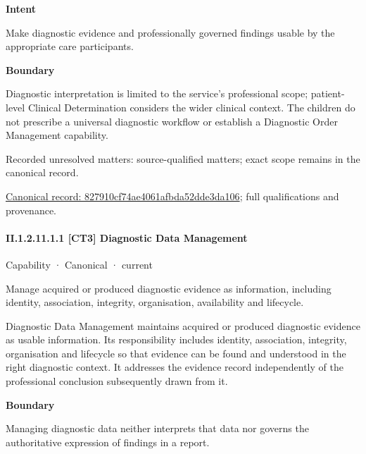 \textbf{Intent}



Make diagnostic evidence and professionally governed findings usable by the appropriate care participants.



\textbf{Boundary}



Diagnostic interpretation is limited to the service's professional scope; patient-level Clinical Determination considers the wider clinical context. The children do not prescribe a universal diagnostic workflow or establish a Diagnostic Order Management capability.


{\small Recorded unresolved matters: source-qualified matters; exact scope remains in the canonical record.}\par
{\footnotesize \href{../../../../continuum/strategy/capability/827910cf74ae4061afbda52dde3da106.md}{Canonical record: 827910cf74ae4061afbda52dde3da106}; full qualifications and provenance.}\par
\paragraph*{II.1.2.11.1.1 [CT3] Diagnostic Data Management}
\label{navigation:II.1.2.11.1.1}

\label{element:aeb8e6d2225a4df38e61ae116850b32c}
{\small Capability · Canonical · current}\par

Manage acquired or produced diagnostic evidence as information, including identity, association, integrity, organisation, availability and lifecycle.



Diagnostic Data Management maintains acquired or produced diagnostic evidence as usable information. Its responsibility includes identity, association, integrity, organisation and lifecycle so that evidence can be found and understood in the right diagnostic context. It addresses the evidence record independently of the professional conclusion subsequently drawn from it.



\textbf{Boundary}



Managing diagnostic data neither interprets that data nor governs the authoritative expression of findings in a report.


